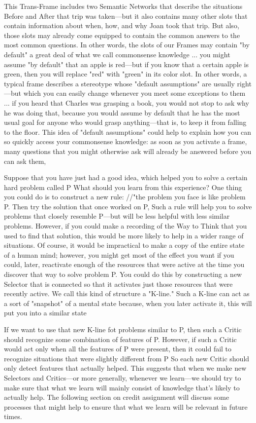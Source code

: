 \documentclass[10pt,a4paper]{article}
\begin{document}
This Trans-Frame includes two Semantic Networks that describe the situations Before and After that trip was taken—but it also contains many other slots that contain information about when, how, and why Joan took that trip. But also, those slots may already come equipped to contain the common answers to the most common questions. In other words, the slots of our Frames may contain "by default" a great deal of what we call commonsense knowledge
...
you might assume "by default" that an apple is red—but if you know that a certain apple is green, then you will replace "red" with "green" in its color slot. In other words, a typical frame describes a stereotype whose "default assumptions" are usually right—but which you can easily change whenever you meet some exceptions to them
...
if you heard that Charles was grasping a book, you would not stop to ask why he was doing that, because you would assume by default that he has the most usual goal for anyone who would grasp anything—that is, to keep it from falling to the floor. This idea of "default assumptions" could help to explain how you can so quickly access your commonsense knowledge: as soon as you activate a frame, many questions that you might otherwise ask will already be answered before you can ask them,\cite[p.~285-286]{minsky}

Suppose that you have just had a good idea, which helped you to solve a certain hard problem called P What should you learn from this experience? One thing you could do is to construct a new rule: //"the problem you face is like problem P. Then try the solution that once worked on P, Such a rule will help you to solve problems that closely resemble P—but will be less helpful with less similar problems. However, if you could make a recording of the Way to Think that you used to find that solution, this would be more likely to help in a wider range of situations.
Of course, it would be impractical to make a copy of the entire state of a human mind; however, you might get most of the effect you want if you could, later, reactivate enough of the resources that were active at the time you discover that way to solve problem P. You could do this by constructing a new Selector that is connected so that it activates just those resources that were recently active. We call this kind of structure a "K-line." Such a K-line can act as a sort of "snapshot" of a mental state because, when you later activate it, this will put you into a similar state \cite[p.~286]{minsky}

If we want to use that new K-line fot problems similar to P, then such a Critic should recognize some combination of features of P. However, if such a Critic would act only when all the features of P were present, then it could fail to recognize situations that were slightly different from P So each new Critic should only detect features that actually helped.
This suggests that when we make new Selectors and Critics—or more generally, whenever we learn—we should try to make sure that what we learn will mainly consist of knowledge that's likely to actually help. The following section on credit assignment will discuss some processes that might help to ensure that what we learn will be relevant in future times. \cite[p.~287-288]{minsky}
\end{document}
